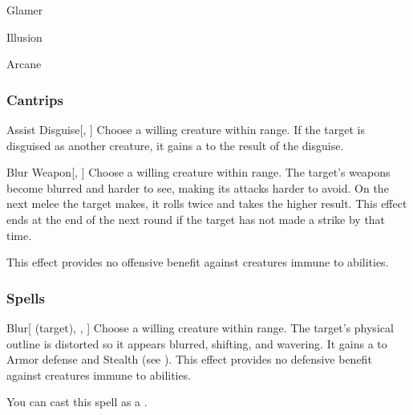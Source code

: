 \newpage
\begin{spellsection}{Glamer}

\begin{spellheader}
\end{spellheader}


 Illusion

 Arcane

\subsubsection{Cantrips}


\begin{freeability}{Assist Disguise}[, ]
Choose a willing creature within \rngclose range.
If the target is disguised as another creature, it gains a   to the result of the disguise.
\end{freeability}


\begin{freeability}{Blur Weapon}[, ]
Choose a willing creature within \rngclose range.
The target's weapons become blurred and harder to see, making its attacks harder to avoid.
On the next melee  the target makes, it rolls twice and takes the higher result.
This effect ends at the end of the next round if the target has not made a strike by that time.

This effect provides no offensive benefit against creatures immune to  abilities.
\end{freeability}

\end{spellsection}


\subsubsection{Spells}


\lowercase{\hypertarget{spell:Blur}{}}\label{spell:Blur}
\begin{attuneability}[\nth{1}]{\hypertarget{spell:Blur}{Blur}}[ (target), , ]
Choose a willing creature within \rngmed range.
The target's physical outline is distorted so it appears blurred, shifting, and wavering.
It gains a   to Armor defense and Stealth (see ).
This effect provides no defensive benefit against creatures immune to  abilities.

You can cast this spell as a .
\end{attuneability}
\vspace{0.25em}




